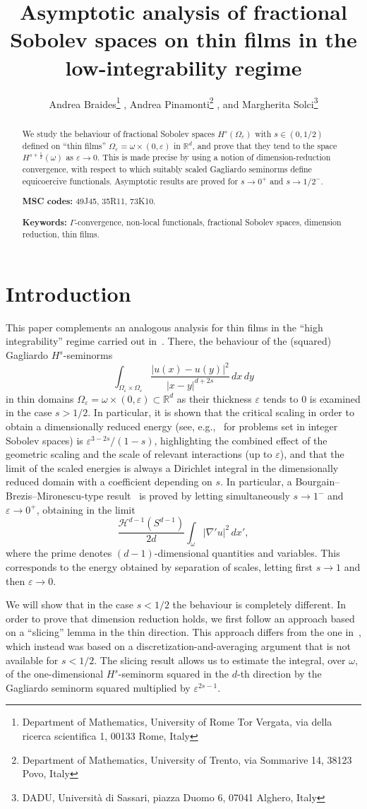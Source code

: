 \documentclass[11pt]{article}
\title{Asymptotic analysis of fractional Sobolev spaces on thin films in the low-integrability regime}
\author{Andrea Braides\footnote{Department of Mathematics, University of Rome Tor Vergata, via della ricerca scientifica 1, 00133 Rome, Italy} , Andrea Pinamonti\footnote{Department of Mathematics, University of Trento, via Sommarive 14, 38123 Povo, Italy} , and Margherita Solci\footnote{DADU, Universit\`a di Sassari, piazza Duomo 6, 07041 Alghero, Italy}}
\date{}
\def\e{\varepsilon}
\begin{document}
\maketitle
\begin{abstract} 
We study the behaviour of fractional Sobolev spaces $H^s(\Omega_\varepsilon)$ with $s\in(0,1/2)$ defined on ``thin films'' $\Omega_\varepsilon=\omega\times (0,\varepsilon)$ in $\mathbb R^d$, and prove that they tend to the space $H^{s+\frac12}(\omega)$ as $\varepsilon\to 0$. This is made precise by using a notion of dimension-reduction convergence, with respect to which suitably scaled Gagliardo seminorms define equicoercive functionals. Asymptotic results are proved for $s\to 0^+$ and $s\to 1/2^-$.
\smallskip

{\bf MSC codes:} 49J45, 35R11, 73K10.

{\bf Keywords:} $\Gamma$-convergence, non-local functionals, fractional Sobolev spaces, dimension reduction, thin films.

\end{abstract}
\section{Introduction}
This paper complements an analogous analysis for thin films in the ``high integrability'' regime carried out in~\cite{BS25}. There, the behaviour of the (squared) Gagliardo $H^s$-seminorms 
\[
\int_{\Omega_\e\times\Omega_\e}
\frac{|u(x)-u(y)|^2}{|x-y|^{d+2s}}\,dx\,dy
\]
in thin domains $\Omega_\e=\omega\times(0,\e)\subset \mathbb R^d$ as their thickness $\e$ tends to $0$ is examined in the case $s>1/2$. In particular, it is shown that the critical scaling in order to obtain a dimensionally reduced energy (see, e.g.,~\cite{LDR} for problems set in integer Sobolev spaces) is $\e^{3-2s}/(1-s)$, highlighting the combined effect of the geometric scaling and the scale of relevant interactions (up to $\e$), and that the limit of the scaled energies is always a Dirichlet integral in the dimensionally reduced domain with a coefficient depending on $s$. In particular, a Bourgain--Brezis--Mironescu-type result~\cite{BBM} is proved by letting simultaneously $s\to 1^-$ and $\e\to 0^+$, obtaining in the limit
\[
\frac{\mathcal H^{d-1}(S^{d-1})}{2d}\int_\omega |\nabla'u|^2\,dx',
\]
where the prime denotes $(d-1)$-dimensional quantities and variables. This corresponds to the energy obtained by separation of scales, letting first $s\to 1$ and then $\e\to 0$.

We will show that in the case $s<1/2$ the behaviour is completely different. In order to prove that dimension reduction holds, we first follow an approach based on a ``slicing'' lemma in the thin direction. This approach differs from the one in~\cite{BS25}, which instead was based on a discretization-and-averaging argument that is not available for $s<1/2$. The slicing result allows us to estimate the integral, over $\omega$, of the one-dimensional $H^s$-seminorm squared in the $d$-th direction by the Gagliardo seminorm squared multiplied by $\e^{2s-1}$.
\end{document}
